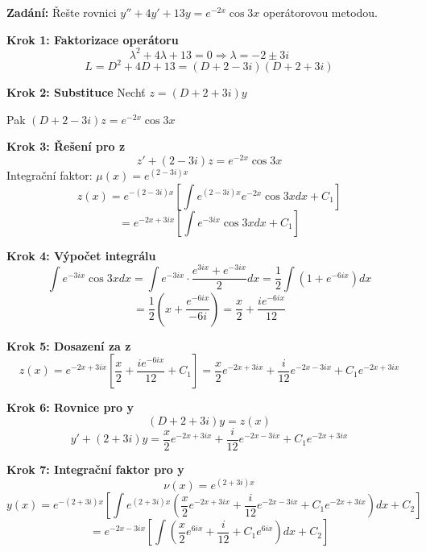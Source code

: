 \begin{example}
\label{ex:operatorova-metoda-faktorizace}

\noindent\textbf{Zadání:} Řešte rovnici $y'' + 4y' + 13y = e^{-2x}\cos 3x$ operátorovou metodou.

\vspace{1.5\baselineskip}

\noindent\textbf{Krok 1: Faktorizace operátoru}
\[
\lambda^2 + 4\lambda + 13 = 0 \Rightarrow \lambda = -2 \pm 3i
\]
\[
L = D^2 + 4D + 13 = (D + 2 - 3i)(D + 2 + 3i)
\]

\vspace{1\baselineskip}

\noindent\textbf{Krok 2: Substituce}
Nechť $z = (D + 2 + 3i)y$

Pak $(D + 2 - 3i)z = e^{-2x}\cos 3x$

\vspace{1\baselineskip}

\noindent\textbf{Krok 3: Řešení pro z}
\[
z' + (2 - 3i)z = e^{-2x}\cos 3x
\]
Integrační faktor: $\mu(x) = e^{(2 - 3i)x}$
\[
z(x) = e^{-(2 - 3i)x} \left[ \int e^{(2 - 3i)x} e^{-2x}\cos 3x dx + C_1 \right]
\]
\[
= e^{-2x + 3ix} \left[ \int e^{-3ix}\cos 3x dx + C_1 \right]
\]

\vspace{1\baselineskip}

\noindent\textbf{Krok 4: Výpočet integrálu}
\[
\int e^{-3ix}\cos 3x dx = \int e^{-3ix} \cdot \frac{e^{3ix} + e^{-3ix}}{2} dx = \frac{1}{2} \int (1 + e^{-6ix}) dx
\]
\[
= \frac{1}{2} \left( x + \frac{e^{-6ix}}{-6i} \right) = \frac{x}{2} + \frac{ie^{-6ix}}{12}
\]

\vspace{1\baselineskip}

\noindent\textbf{Krok 5: Dosazení za z}
\[
z(x) = e^{-2x + 3ix} \left[ \frac{x}{2} + \frac{ie^{-6ix}}{12} + C_1 \right]
= \frac{x}{2}e^{-2x + 3ix} + \frac{i}{12}e^{-2x - 3ix} + C_1 e^{-2x + 3ix}
\]

\vspace{1\baselineskip}

\noindent\textbf{Krok 6: Rovnice pro y}
\[
(D + 2 + 3i)y = z(x)
\]
\[
y' + (2 + 3i)y = \frac{x}{2}e^{-2x + 3ix} + \frac{i}{12}e^{-2x - 3ix} + C_1 e^{-2x + 3ix}
\]

\vspace{1\baselineskip}

\noindent\textbf{Krok 7: Integrační faktor pro y}
\[
\nu(x) = e^{(2 + 3i)x}
\]
\[
y(x) = e^{-(2 + 3i)x} \left[ \int e^{(2 + 3i)x} \left( \frac{x}{2}e^{-2x + 3ix} + \frac{i}{12}e^{-2x - 3ix} + C_1 e^{-2x + 3ix} \right) dx + C_2 \right]
\]
\[
= e^{-2x - 3ix} \left[ \int \left( \frac{x}{2}e^{6ix} + \frac{i}{12} + C_1 e^{6ix} \right) dx + C_2 \right]
\]


\end{example}
